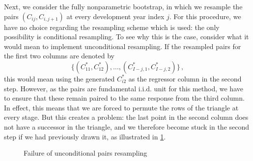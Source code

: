 \documentclass[a4paper]{book}
\begin{document}
Next, we consider the fully nonparametric bootstrap, in which we resample the pairs \linebreak
$(C_{ij}, C_{i, j + 1})$ at every development year index $j$. For this procedure, we have no choice regarding the resampling scheme which is used: the only possibility is conditional resampling. To see why this is the case, consider what it would mean to implement unconditional resampling. If the resampled pairs for the first two columns are denoted by
\begin{displaymath}
  \{ (C^*_{11}, C^*_{12}), \dots, (C^*_{I - j, 1}, C^*_{I - j, 2}) \} \,,
\end{displaymath}
this would mean using the generated $C^*_{i2}$ as the regressor column in the second step. However, as the pairs are fundamental i.i.d. unit for this method, we have to ensure that these remain paired to the same response from the third column. In effect, this means that we are forced to permute the rows of the triangle at every stage. But this creates a problem: the last point in the second column does not have a successor in the triangle, and we therefore become stuck in the second step if we had previously drawn it, as illustrated in \cref{fig:uncond-pairs-resample}.
\begin{figure}[!htb]
  \centering
  \caption{Failure of unconditional pairs resampling}
  \label{fig:uncond-pairs-resample}
\end{figure}
\end{document}
